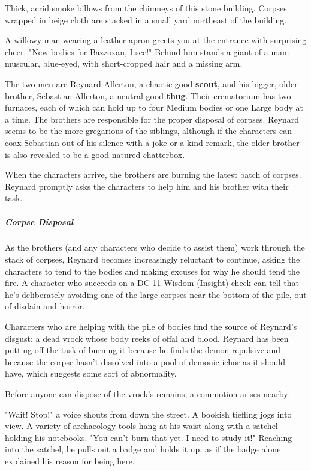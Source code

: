 \documentclass[10pt,a4paper,twoside,bg=print,twocolumn,openany,nodeprecatedcode]{dndbook}
\begin{document}
\begin{DndReadAloud}{}
Thick, acrid smoke billows from the chimneys of this stone building. Corpses wrapped in beige cloth are stacked in a small yard northeast of the building.

A willowy man wearing a leather apron greets you at the entrance with surprising cheer. "New bodies for Bazzoxan, I see!" Behind him stands a giant of a man: muscular, blue-eyed, with short-cropped hair and a missing arm.

\end{DndReadAloud}

The two men are Reynard Allerton, a chaotic good \textbf{scout}, and his bigger, older brother, Sebastian Allerton, a neutral good \textbf{thug}. Their crematorium has two furnaces, each of which can hold up to four Medium bodies or one Large body at a time. The brothers are responsible for the proper disposal of corpses. Reynard seems to be the more gregarious of the siblings, although if the characters can coax Sebastian out of his silence with a joke or a kind remark, the older brother is also revealed to be a good-natured chatterbox.

When the characters arrive, the brothers are burning the latest batch of corpses. Reynard promptly asks the characters to help him and his brother with their task.

\subparagraph{Corpse Disposal}
As the brothers (and any characters who decide to assist them) work through the stack of corpses, Reynard becomes increasingly reluctant to continue, asking the characters to tend to the bodies and making excuses for why he should tend the fire. A character who succeeds on a DC 11 Wisdom (Insight) check can tell that he's deliberately avoiding one of the large corpses near the bottom of the pile, out of disdain and horror.

Characters who are helping with the pile of bodies find the source of Reynard's disgust: a dead vrock whose body reeks of offal and blood. Reynard has been putting off the task of burning it because he finds the demon repulsive and because the corpse hasn't dissolved into a pool of demonic ichor as it should have, which suggests some sort of abnormality.

Before anyone can dispose of the vrock's remains, a commotion arises nearby:

\begin{DndReadAloud}{}
"Wait! Stop!" a voice shouts from down the street. A bookish tiefling jogs into view. A variety of archaeology tools hang at his waist along with a satchel holding his notebooks. "You can't burn that yet. I need to study it!" Reaching into the satchel, he pulls out a badge and holds it up, as if the badge alone explained his reason for being here.

\end{DndReadAloud}
\end{document}
